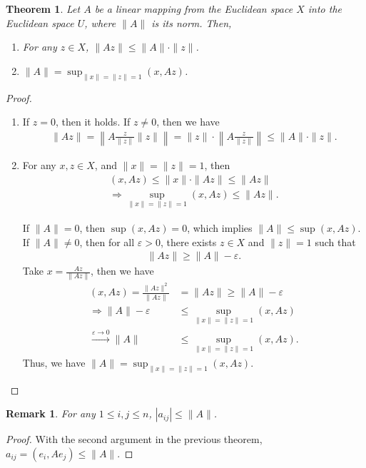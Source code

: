 \documentclass[11pt]{book}
\newtheorem{theorem}{Theorem}[section]
\newtheorem{remark}{Remark}[section]
\theoremstyle{definition}
\numberwithin{equation}{chapter}
\begin{document}
\begin{theorem}
Let $A$ be a linear mapping from the Euclidean space $X$ into the
Euclidean space $U$, where $\|A\|$ is its norm. Then, 
\begin{enumerate}[label=(\alph*)]
    \item For any $z\in X$, $\|Az\|\leq \|A\|\cdot \|z\|$.
    \item $\|A\| = \sup_{\|x\| = \|z\| = 1} (x, Az)$.
\end{enumerate}
\end{theorem}
\begin{proof}
~\begin{enumerate}[label=(\alph*)]
    \item If $z = 0$, then it holds. If $z\neq 0$, then we have 
    \begin{align*}
        \|Az\| = \left\|A \frac{z}{\|z\|}\|z\|\right\| = \|z\|\cdot \left\|A \frac{z}{\|z\|}\right\| \leq \|A\|\cdot \|z\|.
    \end{align*}
    \item For any $x,z\in X$, and $\|x\| = \|z\| = 1$, then 
    \begin{align*}
        (x, Az) \leq \|x\| \cdot \|Az\| \leq \|Az\| \\
        \Rightarrow \sup_{\|x\| = \|z\| = 1} (x, Az) \leq \|Az\|.
    \end{align*}
    
    If $\|A\| = 0$, then $\sup (x, Az) = 0$, which implies $\|A\| \leq \sup (x, Az)$. If $\|A\| \neq 0$, then for all $\varepsilon > 0$, there exists $z \in X$ and $\|z\| = 1$ such that 
    \begin{align*}
        \|Az\| \geq \|A\| - \varepsilon.
    \end{align*}
    Take $x = \frac{Az}{\|Az\|}$, then we have 
    \begin{align*}
        (x, Az) = \frac{\|Az\|^2}{\|Az\|} & = \|Az\| \geq \|A\| - \varepsilon \\
        \Rightarrow \|A\| - \varepsilon & \leq \sup_{\|x\| = \|z\| = 1} (x, Az) \\
        \xrightarrow{\varepsilon \to 0} \|A\| & \leq \sup_{\|x\| = \|z\| = 1} (x, Az).
    \end{align*}
    Thus, we have $\|A\| = \sup_{\|x\| = \|z\| = 1} (x, Az)$.
\end{enumerate}
\end{proof}

\begin{remark}
For any $1\leq i,j\leq n$, $\left|a_{ij}\right| \leq \|A\|$.
\end{remark}
\begin{proof}
With the second argument in the previous theorem, $a_{ij} = (e_i,Ae_j) \leq \|A\|$.
\end{proof}
\end{document}
